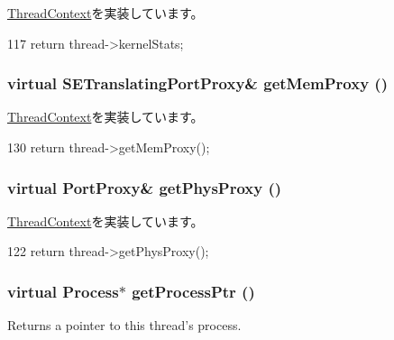 \hyperlink{classThreadContext_a85141770510cf256c27f10adece17ed5}{ThreadContext}を実装しています。


\begin{DoxyCode}
117     { return thread->kernelStats; }
\end{DoxyCode}
\hypertarget{classO3ThreadContext_ae9d873744bcdc5b96477b0b31369de82}{
\subsubsection[{getMemProxy}]{\setlength{\rightskip}{0pt plus 5cm}virtual {\bf SETranslatingPortProxy}\& getMemProxy ()}}
\label{classO3ThreadContext_ae9d873744bcdc5b96477b0b31369de82}


\hyperlink{classThreadContext_a840e8764d04f2a3fb061c56738f3a874}{ThreadContext}を実装しています。


\begin{DoxyCode}
130     { return thread->getMemProxy(); }
\end{DoxyCode}
\hypertarget{classO3ThreadContext_ad157aa6157fa2020e52d8349e448df28}{
\subsubsection[{getPhysProxy}]{\setlength{\rightskip}{0pt plus 5cm}virtual {\bf PortProxy}\& getPhysProxy ()}}
\label{classO3ThreadContext_ad157aa6157fa2020e52d8349e448df28}


\hyperlink{classThreadContext_a2c278159cd0cf8983446313f71dad2b4}{ThreadContext}を実装しています。


\begin{DoxyCode}
122 { return thread->getPhysProxy(); }
\end{DoxyCode}
\hypertarget{classO3ThreadContext_aad103282d1faec25766034788dd59911}{
\subsubsection[{getProcessPtr}]{\setlength{\rightskip}{0pt plus 5cm}virtual {\bf Process}$\ast$ getProcessPtr ()}}
\label{classO3ThreadContext_aad103282d1faec25766034788dd59911}
Returns a pointer to this thread's process. 

